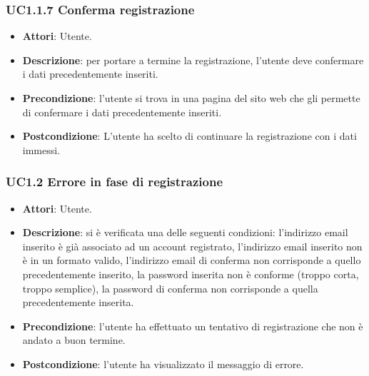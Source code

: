 \subsubsection{UC1.1.7 Conferma registrazione}
\begin{itemize}
\item \textbf{Attori}: Utente.
\item \textbf{Descrizione}: per portare a termine la registrazione, l'utente deve confermare i dati precedentemente inseriti.
\item \textbf{Precondizione}: l'utente si trova in una pagina del sito web che gli permette di confermare i dati precedentemente inseriti.
\item \textbf{Postcondizione}: L'utente ha scelto di continuare la registrazione con i dati immessi.
\end{itemize}
\subsubsection{UC1.2 Errore in fase di registrazione}
\begin{itemize}
\item \textbf{Attori}: Utente.
\item \textbf{Descrizione}: si è verificata una delle seguenti condizioni: l'indirizzo email inserito è già associato ad un account registrato, l'indirizzo email inserito non è in un formato valido, l'indirizzo email di conferma non corrisponde a quello precedentemente inserito, la password inserita non è conforme (troppo corta, troppo semplice), la password di conferma non corrisponde a quella precedentemente inserita.
\item \textbf{Precondizione}: l'utente ha effettuato un tentativo di registrazione che non è andato a buon termine.
\item \textbf{Postcondizione}: l'utente ha visualizzato il messaggio di errore.
\end{itemize}
